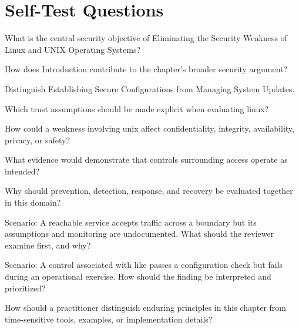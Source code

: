 \documentclass[11pt,letterpaper]{article}
\begin{document}
\section*{Self-Test Questions}
\begin{CornellRecallList}
\item What is the central security objective of Eliminating the Security Weakness of Linux and UNIX Operating Systems?
\item How does Introduction contribute to the chapter's broader security argument?
\item Distinguish Establishing Secure Configurations from Managing System Updates.
\item Which trust assumptions should be made explicit when evaluating linux?
\item How could a weakness involving unix affect confidentiality, integrity, availability, privacy, or safety?
\item What evidence would demonstrate that controls surrounding access operate as intended?
\item Why should prevention, detection, response, and recovery be evaluated together in this domain?
\item Scenario: A reachable service accepts traffic across a boundary but its assumptions and monitoring are undocumented. What should the reviewer examine first, and why?
\item Scenario: A control associated with like passes a configuration check but fails during an operational exercise. How should the finding be interpreted and prioritized?
\item How should a practitioner distinguish enduring principles in this chapter from time-sensitive tools, examples, or implementation details?
\end{CornellRecallList}
\end{document}
